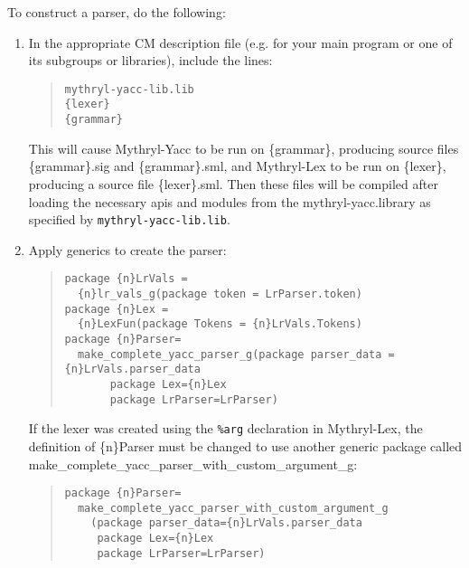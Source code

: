 To construct a parser, do the following:
\begin{enumerate}
\item In the appropriate CM description file (e.g. for your main
program or one of its subgroups or libraries), include the lines:
\begin{quote}
\begin{verbatim}
mythryl-yacc-lib.lib
{lexer}
{grammar}
\end{verbatim}  
\end{quote}
This will cause Mythryl-Yacc to be run on \{grammar\}, producing source files
\{grammar\}.sig and \{grammar\}.sml, and Mythryl-Lex to be run on
\{lexer\}, producing a source file \{lexer\}.sml.  Then these files
will be compiled after loading the necessary apis and modules
from the mythryl-yacc.library as specified by {\tt mythryl-yacc-lib.lib}.
\item Apply generics to create the parser:
\begin{quote}
\begin{verbatim}
package {n}LrVals =
  {n}lr_vals_g(package token = LrParser.token)
package {n}Lex = 
  {n}LexFun(package Tokens = {n}LrVals.Tokens)
package {n}Parser=
  make_complete_yacc_parser_g(package parser_data = {n}LrVals.parser_data
       package Lex={n}Lex
       package LrParser=LrParser)
\end{verbatim}
\end{quote}
If the lexer was created using the {\tt \%arg} declaration in Mythryl-Lex,
the definition of \{n\}Parser must be changed to use another generic package
called make_complete_yacc_parser_with_custom_argument_g:
\begin{quote}
\begin{verbatim}
package {n}Parser=
  make_complete_yacc_parser_with_custom_argument_g
    (package parser_data={n}LrVals.parser_data
     package Lex={n}Lex
     package LrParser=LrParser)
\end{verbatim}
\end{quote}
\end{enumerate}

